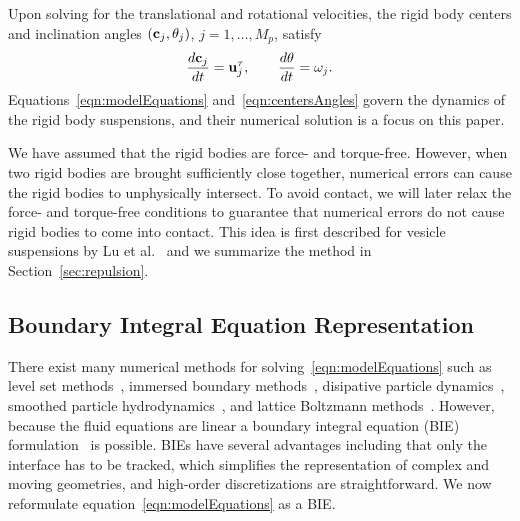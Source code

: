 \documentclass[preprint, 10pt]{elsarticle}
\begin{document}
Upon solving for the translational and rotational velocities, the rigid
body centers and inclination angles $({\mathbf{c}}_j,\theta_j)$,
$j=1,\ldots,M_p$, satisfy
\begin{align}
\begin{split}
  \frac{d{\mathbf{c}}_j}{dt} = {\mathbf{u}}^\tau_j, \qquad 
  \frac{d\theta}{dt} = \omega_j.
\end{split}
\label{eqn:centersAngles}
\end{align}
Equations~\eqref{eqn:modelEquations} and~\eqref{eqn:centersAngles} govern
the dynamics of the rigid body suspensions, and their numerical solution
is a focus on this paper.

We have assumed that the rigid bodies are force- and torque-free.
However, when two rigid bodies are brought sufficiently close together,
numerical errors can cause the rigid bodies to unphysically intersect.
To avoid contact,  we will later relax the force- and torque-free
conditions to guarantee that numerical errors do not cause rigid bodies
to come into contact.  This idea is first described for
vesicle suspensions by Lu et al.~\cite{Lu2017} and we summarize the
method in Section~\ref{sec:repulsion}.  


\subsection{Boundary Integral Equation Representation}
There exist many numerical methods for
solving~\eqref{eqn:modelEquations} such as level set
methods~\cite{Dou2007}, immersed boundary methods~\cite{Mittal2005},
disipative particle dynamics~\cite{Pivkin2010}, smoothed particle
hydrodynamics~\cite{Polfer2016}, and lattice Boltzmann
methods~\cite{Ladd1994a, Ladd1994b}. However, because the fluid
equations are linear a boundary integral equation (BIE)
formulation~\cite{Pozrikidis1992} is possible.  BIEs have several
advantages including that only the interface has to be tracked, which
simplifies the representation of complex and moving geometries, and
high-order discretizations are straightforward.  We now reformulate
equation~\eqref{eqn:modelEquations} as a BIE.
\end{document}
